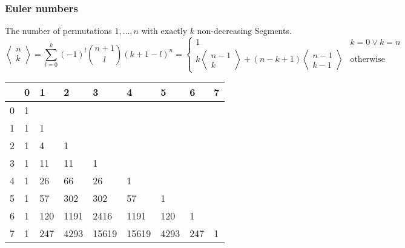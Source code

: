 \subsubsection{Euler numbers}

The number of permutations $1,\ldots, n$ with exactly $k$
non-decreasing Segments.
\begin{equation*}
  \left\langle
    \begin{matrix}
      n\\k
    \end{matrix}
\right\rangle = \sum\limits_{l = 0}^k(-1)^l \binom{n + 1}{l}(k + 1 - l)^n
  =
  \begin{cases}
    1 & k = 0 \lor k = n\\
    k \left\langle
      \begin{smallmatrix}
        n - 1\\k
      \end{smallmatrix}
\right\rangle + (n - k + 1) \left\langle
  \begin{smallmatrix}
    n - 1\\k - 1
  \end{smallmatrix}
\right\rangle & \text{otherwise}
  \end{cases}
\end{equation*}

\begin{center}
	\begin{tabular}{ |l||l|l|l|l|l|l|l|l| } 
		\hline
		\diagbox{$n$}{$k$} & 0 & 1 & 2 & 3 & 4 & 5 & 6 & 7  \\
		\hline\hline
		0 &  1 &     &      &       &        &       &      &    \\
		1 &  1 & 1   &      &       &        &       &      &    \\
		2 &  1 & 4   & 1    &       &        &       &      &    \\
		3 &  1 & 11  & 11   & 1     &        &       &      &    \\
		4 &  1 & 26  & 66   & 26    & 1      &       &      &    \\
		5 &  1 & 57  & 302  & 302   & 57     & 1     &      &    \\
		6 &  1 & 120 & 1191 & 2416  & 1191   & 120   & 1    &    \\
		7 &  1 & 247 & 4293 & 15619 & 15619  & 4293  & 247  & 1  \\
		\hline
	\end{tabular}
\end{center}

